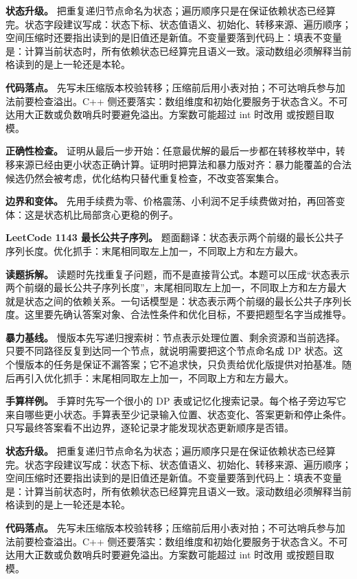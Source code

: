 \textbf{状态升级。} 把重复递归节点命名为状态；遍历顺序只是在保证依赖状态已经算完。状态字段建议写成：状态下标、状态值语义、初始化、转移来源、遍历顺序；空间压缩时还要指出读到的是旧值还是新值。不变量要落到代码上：填表不变量是：计算当前状态时，所有依赖状态已经算完且语义一致。滚动数组必须解释当前格读到的是上一轮还是本轮。

\textbf{代码落点。} 先写未压缩版本校验转移；压缩前后用小表对拍；不可达哨兵参与加法前要检查溢出。C++ 侧还要落实：数组维度和初始化要服务于状态含义。不可达用大正数或负数哨兵时要避免溢出。方案数可能超过 int 时改用  或按题目取模。

\textbf{正确性检查。} 证明从最后一步开始：任意最优解的最后一步都在转移枚举中，转移来源已经由更小状态正确计算。证明时把算法和暴力版对齐：暴力能覆盖的合法候选仍然会被考虑，优化结构只替代重复检查，不改变答案集合。

\textbf{边界和变体。} 先用手续费为零、价格震荡、小利润不足手续费做对拍，再回答变体：这是状态机比局部贪心更稳的例子。

\noindent\textbf{LeetCode 1143 最长公共子序列。} 题面翻译：状态表示两个前缀的最长公共子序列长度。优化抓手：末尾相同取左上加一，不同取上方和左方最大。

\textbf{读题拆解。} 读题时先找重复子问题，而不是直接背公式。本题可以压成“状态表示两个前缀的最长公共子序列长度”，末尾相同取左上加一，不同取上方和左方最大就是状态之间的依赖关系。一句话模型是：状态表示两个前缀的最长公共子序列长度。这里要先确认答案对象、合法性条件和优化目标，不要把题型名字当成推导。

\textbf{暴力基线。} 慢版本先写递归搜索树：节点表示处理位置、剩余资源和当前选择。只要不同路径反复到达同一个节点，就说明需要把这个节点命名成 DP 状态。这个慢版本的任务是保证不漏答案；它不追求快，只负责给优化版提供对拍基准。随后再引入优化抓手：末尾相同取左上加一，不同取上方和左方最大。

\textbf{手算样例。} 手算时先写一个很小的 DP 表或记忆化搜索记录。每个格子旁边写它来自哪些更小状态。手算表至少记录输入位置、状态变化、答案更新和停止条件。只写最终答案看不出边界，逐轮记录才能发现状态更新顺序是否错。

\textbf{状态升级。} 把重复递归节点命名为状态；遍历顺序只是在保证依赖状态已经算完。状态字段建议写成：状态下标、状态值语义、初始化、转移来源、遍历顺序；空间压缩时还要指出读到的是旧值还是新值。不变量要落到代码上：填表不变量是：计算当前状态时，所有依赖状态已经算完且语义一致。滚动数组必须解释当前格读到的是上一轮还是本轮。

\textbf{代码落点。} 先写未压缩版本校验转移；压缩前后用小表对拍；不可达哨兵参与加法前要检查溢出。C++ 侧还要落实：数组维度和初始化要服务于状态含义。不可达用大正数或负数哨兵时要避免溢出。方案数可能超过 int 时改用  或按题目取模。

